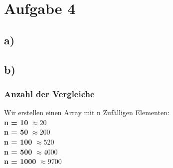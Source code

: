 \pagebreak
\section*{Aufgabe 4}
\subsection*{a)}

\pagebreak
\subsection*{b)}
\subsubsection*{Anzahl der Vergleiche}
Wir erstellen einen Array mit n Zufälligen Elementen:\\
\textbf{n = 10} $ \approx 20 $\\
\textbf{n = 50} $ \approx 200 $\\
\textbf{n = 100} $ \approx 520 $\\
\textbf{n = 500} $ \approx 4000 $\\
\textbf{n = 1000} $ \approx 9700 $\\
